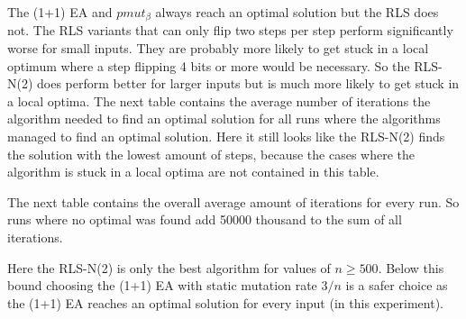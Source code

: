 

The (1+1) EA and $pmut_\beta$ always reach an optimal solution but the RLS does not.
The RLS variants that can only flip two steps per step perform significantly worse for small inputs.
They are probably more likely to get stuck in a local optimum where a step flipping 4 bits or more would be necessary.
So the RLS-N(2) does perform better for larger inputs but is much more likely to get stuck in a local optima.
The next table contains the average number of iterations the algorithm needed to find an optimal solution for all runs where the algorithms managed to find an optimal solution.
Here it still looks like the RLS-N(2) finds the solution with the lowest amount of steps, because the cases where the algorithm is stuck in a local optima are not contained in this table.



The next table contains the overall average amount of iterations for every run.
So runs where no optimal was found add 50000 thousand to the sum of all iterations.



Here the RLS-N(2) is only the best algorithm for values of $n \ge 500$.
Below this bound choosing the (1+1) EA with static mutation rate $3/n$ is a safer choice as the (1+1) EA reaches an optimal solution for every input (in this experiment).
